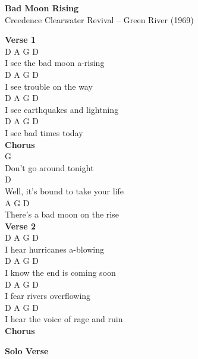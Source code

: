 \documentclass[a4paper]{article}
\begin{document}
    \begin{center}
        \textbf{Bad Moon Rising}
        ~\\
        Creedence Clearwater Revival -- Green River (1969)
    \end{center}
    {
        \scriptsize
        \textbf{Verse 1}
        ~\\
        {
            \cutive
            \obeyspaces
D         A   G      D
\\
I see the bad moon a-rising
\\
D     A       G     D
\\
I see trouble on the way
\\
D     A    G          D
\\
I see earthquakes and lightning
\\
D     A   G       D
\\
I see bad times today
\\

        }
        \textbf{Chorus}
        ~\\
        {
            \cutive
            \obeyspaces
G
\\
Don't go around tonight
\\
           D
\\
Well, it's bound to take your life
\\
A         G               D
\\
There's a bad moon on the rise
\\

        }
        \textbf{Verse 2}
        ~\\
        {
            \cutive
            \obeyspaces
D      A    G       D
\\
I hear hurricanes a-blowing
\\
D          A      G      D
\\
I know the end is coming soon
\\
D      A      G   D
\\
I fear rivers overflowing
\\
D          A        G        D
\\
I hear the voice of rage and ruin
\\

        }
        \textbf{Chorus}
        ~\\
        {
            \cutive
            \obeyspaces

        }
        \textbf{Solo Verse}
        ~\\
        {
            \cutive
            \obeyspaces

}}
\end{document}
